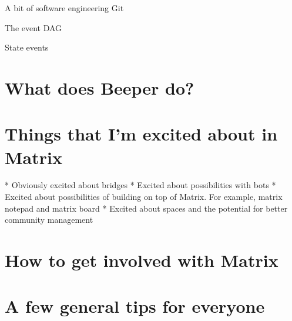 \documentclass{acm}
\begin{document}
\begin{frame}{A bit of software engineering}
    Git
\end{frame}

\begin{frame}{The event DAG}

\end{frame}

\begin{frame}{State events}

\end{frame}

\section{What does Beeper do?}


\section{Things that I'm excited about in Matrix}

\begin{frame}
  * Obviously excited about bridges
  * Excited about possibilities with bots
  * Excited about possibilities of building on top of Matrix. For example,
    matrix notepad and matrix board
  * Excited about spaces and the potential for better community management
\end{frame}

\section{How to get involved with Matrix}

\section{A few general tips for everyone}
\end{document}
